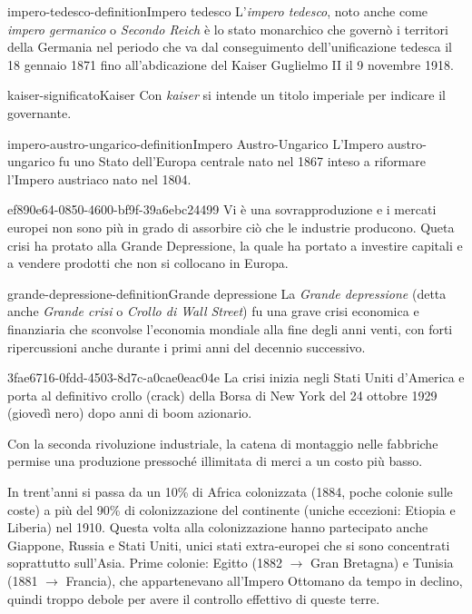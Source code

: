 \documentclass[preview]{standalone}
\begin{document}
\begin{snippetdefinition}{impero-tedesco-definition}{Impero tedesco}
    L'\textit{impero tedesco}, noto anche come \textit{impero germanico}
    o \textit{Secondo Reich} è lo stato monarchico che governò i
    territori della Germania nel periodo che va dal conseguimento
    dell'unificazione tedesca il 18 gennaio 1871 fino all'abdicazione del
    Kaiser Guglielmo II il 9 novembre 1918. 
\end{snippetdefinition}

\begin{snippetnote}{kaiser-significato}{Kaiser}
    Con \textit{kaiser} si intende un titolo imperiale per indicare il governante.
\end{snippetnote}

\begin{snippetdefinition}{impero-austro-ungarico-definition}{Impero Austro-Ungarico}
    L'Impero austro-ungarico fu uno Stato dell'Europa centrale nato nel 1867
    inteso a riformare l'Impero austriaco nato nel 1804.
\end{snippetdefinition}

\begin{snippet}{ef890e64-0850-4600-bf9f-39a6ebc24499}
    Vi è una sovrapproduzione e i mercati europei non sono più in grado di assorbire ciò che le industrie producono.
    Queta crisi ha protato alla Grande Depressione, la quale ha portato a investire capitali 
    e a vendere prodotti che non si collocano in Europa.
\end{snippet}

\begin{snippetdefinition}{grande-depressione-definition}{Grande depressione}
    La \textit{Grande depressione} (detta anche \textit{Grande crisi} o
    \textit{Crollo di Wall Street}) fu una grave crisi economica e finanziaria che
    sconvolse l'economia mondiale alla fine degli anni venti,
    con forti ripercussioni anche durante i primi anni del decennio successivo.
\end{snippetdefinition}

\begin{snippet}{3fae6716-0fdd-4503-8d7c-a0cae0eac04e}
    La crisi inizia negli Stati Uniti d'America e porta al definitivo crollo
    (crack) della Borsa di New York del 24 ottobre 1929 (giovedì nero) dopo anni di boom azionario. 
    
    Con la seconda rivoluzione industriale, la catena di montaggio nelle fabbriche
    permise una produzione pressoché illimitata di merci a un costo più basso.
    
    In trent'anni si passa da un 10\% di Africa colonizzata (1884, poche colonie sulle coste)
    a più del 90\% di
    colonizzazione del continente (uniche eccezioni: Etiopia e Liberia) nel 1910.
    Questa volta alla colonizzazione hanno partecipato anche Giappone, Russia e Stati Uniti, unici stati
    extra-europei che si sono concentrati soprattutto sull'Asia.
    Prime colonie: Egitto (1882 \(\rightarrow\) Gran Bretagna) e Tunisia (1881 \(\rightarrow\) Francia), che appartenevano
    all'Impero Ottomano da tempo in declino, quindi troppo debole per avere il controllo effettivo di
    queste terre.
\end{snippet}
\end{document}
